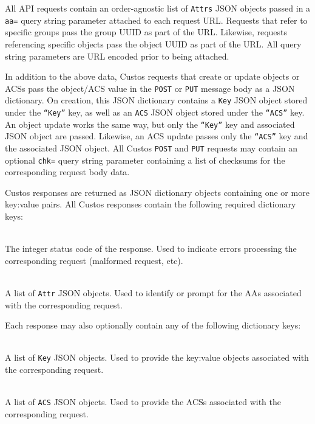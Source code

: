 All API requests contain an order-agnostic list of \texttt{Attrs} JSON
objects passed in a \texttt{aa=} query string parameter attached to
each request URL. Requests that refer to specific groups pass the
group UUID as part of the URL. Likewise, requests referencing specific
objects pass the object UUID as part of the URL. All query string
parameters are URL encoded prior to being attached.

In addition to the above data, Custos requests that create or update
objects or ACSs pass the object/ACS value in the \texttt{POST} or
\texttt{PUT} message body as a JSON dictionary. On creation, this JSON
dictionary contains a \texttt{Key} JSON object stored under the
\texttt{``Key''} key, as well as an \texttt{ACS} JSON object stored
under the \texttt{``ACS''} key. An object update works the same way,
but only the \texttt{``Key''} key and associated JSON object are
passed. Likewise, an ACS update passes only the \texttt{``ACS''} key
and the associated JSON object. All Custos \texttt{POST} and
\texttt{PUT} requests may contain an optional \texttt{chk=} query
string parameter containing a list of checksums for the corresponding
request body data.

Custos responses are returned as JSON dictionary objects containing
one or more key:value pairs. All Custos responses contain the
following required dictionary keys:

\begin{packed_desc}
\item[\texttt{Status}] \hfill \\ The integer status code of the
  response. Used to indicate errors processing the corresponding
  request (malformed request, etc).
\item[\texttt{Attrs}] \hfill \\ A list of \texttt{Attr} JSON
  objects. Used to identify or prompt for the AAs associated with the
  corresponding request.
\end{packed_desc}

\noindent
Each response may also optionally contain any of the following
dictionary keys:

\begin{packed_desc}
\item[\texttt{Keys}] \hfill \\ A list of \texttt{Key} JSON
  objects. Used to provide the key:value objects associated with the
  corresponding request.
\item[\texttt{ACSs}] \hfill \\ A list of \texttt{ACS} JSON
  objects. Used to provide the ACSs associated with the corresponding
  request.
\end{packed_desc}

